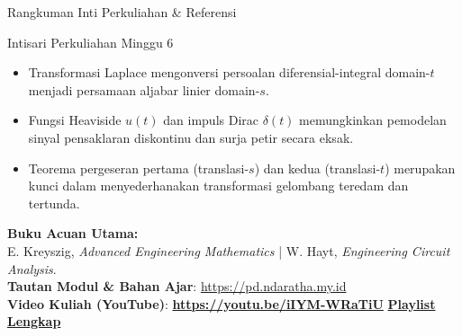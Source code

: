 \documentclass[aspectratio=169,10pt]{beamer}
\begin{document}
\begin{frame}{Rangkuman Inti Perkuliahan \& Referensi}
  \begin{exampleblock}{Intisari Perkuliahan Minggu 6}
    \begin{itemize}
      \item Transformasi Laplace mengonversi persoalan diferensial-integral domain-$t$ menjadi persamaan aljabar linier domain-$s$.
      \item Fungsi Heaviside $u(t)$ dan impuls Dirac $\delta(t)$ memungkinkan pemodelan sinyal pensaklaran diskontinu dan surja petir secara eksak.
      \item Teorema pergeseran pertama (translasi-$s$) dan kedua (translasi-$t$) merupakan kunci dalam menyederhanakan transformasi gelombang teredam dan tertunda.
    \end{itemize}
  \end{exampleblock}
  \vspace{0.2cm}
  \begin{center}
    \small \textbf{Buku Acuan Utama:} \\
    E. Kreyszig, \textit{Advanced Engineering Mathematics} | W. Hayt, \textit{Engineering Circuit Analysis}. \\
    \vspace{0.3cm}
    \textbf{Tautan Modul \& Bahan Ajar}: \url{https://pd.ndaratha.my.id} \\[0.12cm]\textbf{Video Kuliah (YouTube)}: {\color{red!85!black}\textbf{\url{https://youtu.be/iIYM-WRaTiU}}} \quad \textbar \quad \href{https://www.youtube.com/playlist?list=PLS5oOZWXZeTw}{\color{unibblue}\textbf{Playlist Lengkap}}
  \end{center}
\end{frame}
\end{document}
